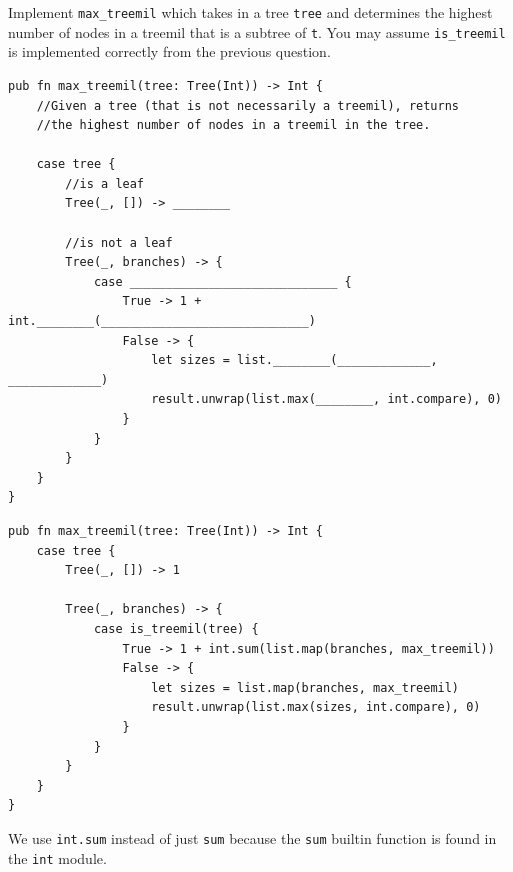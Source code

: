 \begin{blocksection}
\question Implement \texttt{max\_treemil} which takes in a tree \texttt{tree} and
determines the highest number of nodes in a treemil that is a subtree of
\texttt{t}. You may assume \texttt{is\_treemil} is implemented correctly from the
previous question.
\newline

\begin{lstlisting}
pub fn max_treemil(tree: Tree(Int)) -> Int {
    //Given a tree (that is not necessarily a treemil), returns
    //the highest number of nodes in a treemil in the tree.

    case tree {
        //is a leaf
        Tree(_, []) -> ________

        //is not a leaf
        Tree(_, branches) -> {
            case _____________________________ {
                True -> 1 + int.________(_____________________________)
                False -> {
                    let sizes = list.________(_____________, _____________)
                    result.unwrap(list.max(________, int.compare), 0)
                }
            }
        }
    }
}
\end{lstlisting}
\begin{solution}
\begin{lstlisting}
pub fn max_treemil(tree: Tree(Int)) -> Int {
    case tree {
        Tree(_, []) -> 1

        Tree(_, branches) -> {
            case is_treemil(tree) {
                True -> 1 + int.sum(list.map(branches, max_treemil))
                False -> {
                    let sizes = list.map(branches, max_treemil)
                    result.unwrap(list.max(sizes, int.compare), 0)
                }
            }
        }
    }
}
\end{lstlisting}
\end{solution}
\begin{questionmeta}
    We use \lstinline{int.sum} instead of just \lstinline{sum} because the \lstinline{sum} builtin function is found in the \lstinline{int} module.
    

\end{questionmeta}
\end{blocksection}
